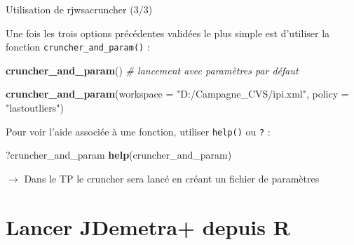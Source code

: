\documentclass[10pt,xcolor=table,color={dvipsnames,usenames},ignorenonframetext,usepdftitle=false,french]{beamer}
\newenvironment{Shaded}{\begin{snugshade}}{\end{snugshade}}
\newcommand{\CommentTok}[1]{\textcolor[rgb]{0.56,0.35,0.01}{\textit{#1}}}
\newcommand{\DataTypeTok}[1]{\textcolor[rgb]{0.13,0.29,0.53}{#1}}
\newcommand{\KeywordTok}[1]{\textcolor[rgb]{0.13,0.29,0.53}{\textbf{#1}}}
\newcommand{\NormalTok}[1]{#1}
\newcommand{\StringTok}[1]{\textcolor[rgb]{0.31,0.60,0.02}{#1}}
\begin{document}
\begin{frame}[fragile]{Utilisation de rjwsacruncher (3/3)}
\protect\hypertarget{utilisation-de-rjwsacruncher-33}{}

Une fois les trois options précédentes validées le plus simple est
d'utiliser la fonction \texttt{cruncher\_and\_param()} :

\begin{Shaded}
\begin{Highlighting}[]
\KeywordTok{cruncher_and_param}\NormalTok{() }\CommentTok{# lancement avec paramètres par défaut}

\KeywordTok{cruncher_and_param}\NormalTok{(}\DataTypeTok{workspace =} \StringTok{"D:/Campagne_CVS/ipi.xml"}\NormalTok{,}
                   \DataTypeTok{policy =} \StringTok{"lastoutliers"}\NormalTok{)}
\end{Highlighting}
\end{Shaded}

Pour voir l'aide associée à une fonction, utiliser \texttt{help()} ou
\texttt{?} :

\begin{Shaded}
\begin{Highlighting}[]
\NormalTok{?cruncher_and_param}
\KeywordTok{help}\NormalTok{(cruncher_and_param)}
\end{Highlighting}
\end{Shaded}

\(\longrightarrow\) Dans le TP le cruncher sera lancé en créant un
fichier de paramètres

\end{frame}

\hypertarget{lancer-jdemetra-depuis-r}{%
\section{Lancer JDemetra+ depuis R}\label{lancer-jdemetra-depuis-r}}
\end{document}
